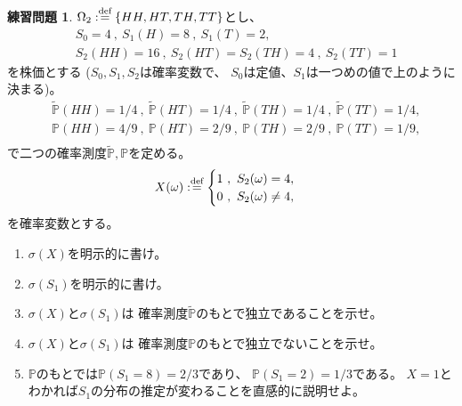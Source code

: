 \documentclass[uplatex]{jsarticle}
\theoremstyle{definition}
\newtheorem{prob}[prob]{練習問題}
\def\P{\mathbb{P}}
\def\dfn{:\overset{\mbox{{\scriptsize def}}}{=}}
\begin{document}
\begin{prob}\label{prob: 2.2}
  \(\Omega_2 \dfn \left\{ HH,HT,TH,TT\right\}\)とし、
  \begin{align*}
    & S_0 = 4 \ , \ S_1(H) = 8 \ , \ S_1(T) = 2, \\
    & S_2(HH) = 16 \ , \ S_2(HT) = S_2(TH) = 4 \ , \ S_2(TT) = 1
  \end{align*}
  を株価とする (\(S_0,S_1,S_2\)は確率変数で、
  \(S_0\)は定値、\(S_1\)は一つめの値で上のように決まる)。
  \begin{align*}
    & \tilde{\P}(HH) = 1/4 \ , \ \tilde{\P}(HT) = 1/4 \ , \
    \tilde{\P}(TH) = 1/4 \ , \ \tilde{\P}(TT) = 1/4, \\
    & \P(HH) = 4/9 \ , \ \P(HT) = 2/9 \ , \
    \P(TH) = 2/9 \ , \ \P(TT) = 1/9, \\
  \end{align*}
  で二つの確率測度\(\tilde{\P},\P\)を定める。
  \[
  X(\omega) \dfn
  \begin{cases}
    1 \ , \ S_2(\omega)=4, \\
    0 \ , \ S_2(\omega)\neq 4,
  \end{cases}
  \]
  を確率変数とする。
  \begin{enumerate}
    \item \label{enumi: 2.2-1}
    \(\sigma(X)\)を明示的に書け。
    \item \label{enumi: 2.2-2}
    \(\sigma(S_1)\)を明示的に書け。
    \item \label{enumi: 2.2-3}
    \(\sigma(X)\)と\(\sigma(S_1)\)は
    確率測度\(\tilde{\P}\)のもとで独立であることを示せ。
    \item \label{enumi: 2.2-4}
    \(\sigma(X)\)と\(\sigma(S_1)\)は
    確率測度\(\P\)のもとで独立でないことを示せ。
    \item \label{enumi: 2.2-5}
    \(\P\)のもとでは\(\P(S_1=8) = 2/3\)であり、
    \(\P(S_1=2) = 1/3\)である。
    \(X=1\)とわかれば\(S_1\)の分布の推定が変わることを直感的に説明せよ。
  \end{enumerate}
\end{prob}
\end{document}
